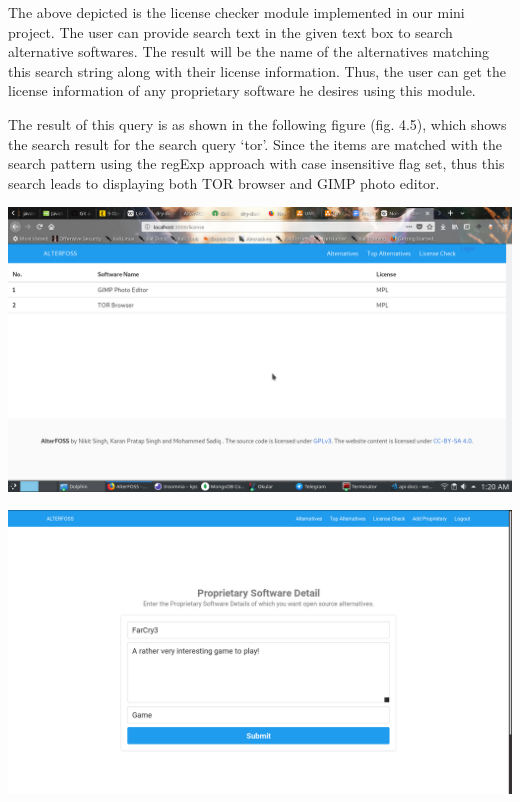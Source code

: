 The above depicted is the license checker module implemented in our mini project. The user can provide search text in the given text box to search alternative softwares. The result will be the name of the alternatives matching this search string along with their license information. Thus, the user can get the license information of any proprietary software he desires using this module.

The result of this query is as shown in the following figure (fig. 4.5), which shows the search result for the search query ‘tor’. Since the items are matched with the search pattern using the regExp approach with case insensitive flag set, thus this search leads to displaying both TOR browser and GIMP photo editor.

\begin{center}
\includegraphics[scale=0.45]{images/4-5.png}
\end{center}

\begin{center}
\includegraphics[scale=0.285]{images/4-6.png}
\end{center}

